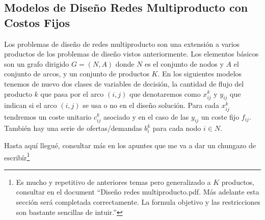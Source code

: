 \subsection{Modelos de Diseño Redes Multiproducto con Costos Fijos}

Los problemas de diseño de redes multiproducto son una extensión a varios productos de los problemas de diseño vistos
anteriormente. Los elementos básicos son un grafo dirigido $G=(N,A)$ donde $N$ es el conjunto de nodos y $A$ el conjunto de
arcos, y un conjunto de productos $K$. En los siguientes modelos tenemos de nuevo dos clases de variables de decisión, la
cantidad de flujo del producto $k$ que pasa por el arco $(i,j)$ que denotaremos como $x_{ij}^k$ y $y_{ij}$ que indican si el
arco $(i,j)$ se usa o no en el diseño solución. Para cada $x_{ij}^k$ tendremos un coste unitario $c_{ij}^k$ asociado y en el
caso de las $y_{ij}$ un coste fijo $f_{ij}$. También hay una serie de ofertas/demandas $b_i^k$ para cada nodo $i\in N$.

\begin{flushright}
    Hasta aquí llegué, consultar más en los apuntes que me va a dar un chungazo de escribír\footnote{Es mucho y repetitivo de 
    anteriores temas pero generalizado a $K$ productos, consultar en el document ``Diseño redes multiproducto.pdf. Más adelante
    esta sección será completada correctamente. La formula objetivo y las restricciones son bastante sencillas de intuir.''}
\end{flushright}